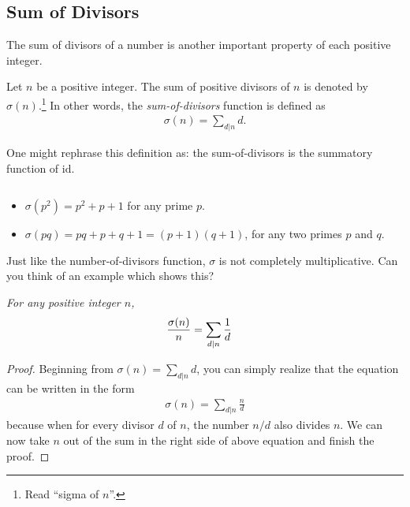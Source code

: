 \documentclass[12pt]{subfile}
\begin{document}
	\subsection{Sum of Divisors}\label{sec:sum-of-divisors}
		The sum of divisors of a number is another important property of each positive integer. 
		
		\begin{definition}
			Let $n$ be a positive integer. The sum of positive divisors of $n$ is denoted by $\sigma(n)$.\footnote{Read ``sigma of $n$''.} In other words, the \textit{sum-of-divisors} function is defined as
			\begin{align*}
			\sigma(n)=\sum_{d|n} d.
			\end{align*}
		\end{definition}
		
		\begin{note}
			One might rephrase this definition as: the sum-of-divisors is the summatory function of $\text{id}$.
		\end{note}
		
		\begin{example}
			$ $
			\begin{itemize}
				\item $\sigma(p^2) = p^2+p+1$ for any prime $p$.
				\item $\sigma(pq)=pq+p+q+1=(p+1)(q+1)$, for any two primes $p$ and $q$.
			\end{itemize}
		\end{example}
		
		
		
		\begin{note}
			Just like the number-of-divisors function, $\sigma$ is not completely multiplicative. Can you think of an example which shows this?
		\end{note}
		
		\begin{theorem}\slshape\label{thm:sodfrac}
			For any positive integer $n$, 
				\begin{align*}
					\dfrac{\sigma (n)}{n} & = \sum_{d|n}\dfrac{1}{d}
				\end{align*}
		\end{theorem}
		
		\begin{proof}
			Beginning from $\sigma(n) = \sum\limits_{d|n} d$, you can simply realize that the equation can be written in the form
			\begin{align*}
			\sigma(n) = \sum_{d|n} \frac{n}{d}
			\end{align*}
			because when for every divisor $d$ of $n$, the number $n/d$ also divides $n$. We can now take $n$ out of the sum in the right side of above equation and finish the proof.
		\end{proof}
		
\end{document}
